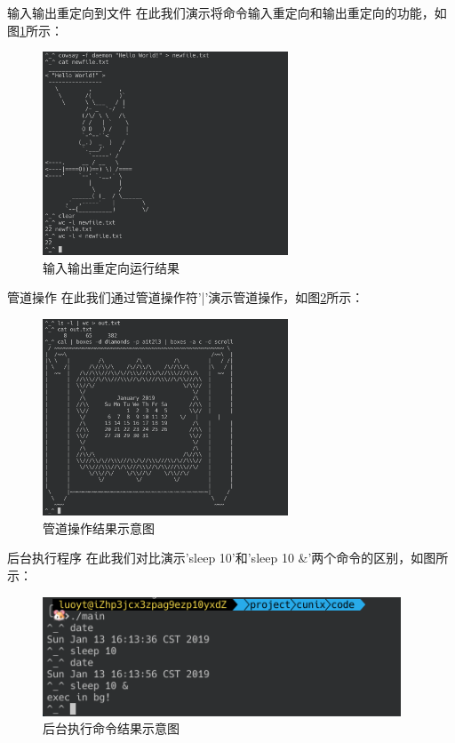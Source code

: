 \documentclass[10pt]{beamer}
\begin{document}
\begin{frame}{输入输出重定向到文件}
在此我们演示将命令输入重定向和输出重定向的功能，如图\ref{redirect}所示：
\begin{figure}[htbp]
	\centering
	\includegraphics[width=0.65\textwidth]{images/redirect}
	\caption{\label{redirect}输入输出重定向运行结果}
\end{figure}
\end{frame}

\begin{frame}{管道操作}
在此我们通过管道操作符'|'演示管道操作，如图\ref{pipe}所示：
\begin{figure}[htbp]
	\centering
	\includegraphics[width=0.65\textwidth]{images/pipe}
	\caption{\label{pipe}管道操作结果示意图}
\end{figure}
\end{frame}

\begin{frame}{后台执行程序}
在此我们对比演示'sleep 10'和'sleep 10 \&'两个命令的区别，如图所示：
\begin{figure}[htbp]
	\centering
	\includegraphics[width=0.95\textwidth]{images/bg}
	\caption{\label{bg}后台执行命令结果示意图}
\end{figure}
\end{frame}
\end{document}
